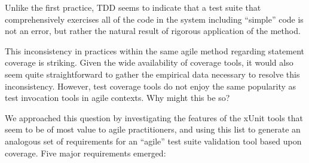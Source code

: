 \documentclass[10pt,twocolumn]{article}
\begin{document}
Unlike the first practice, TDD seems to indicate that a test suite that
comprehensively exercises all of the code in the system including
``simple'' code is not an error, but rather the natural result of rigorous
application of the method.


This inconsistency in practices within the same agile method regarding
statement coverage is striking.  Given the wide availability of coverage
tools, it would also seem quite straightforward to gather the empirical
data necessary to resolve this inconsistency.  However, test coverage tools
do not enjoy the same popularity as test invocation tools in agile
contexts. Why might this be so?

We approached this question by investigating the features of the xUnit
tools that seem to be of most value to agile practitioners, and using this
list to generate an analogous set of requirements for an ``agile'' test
suite validation tool based upon coverage.  Five major requirements
emerged:
\end{document}
